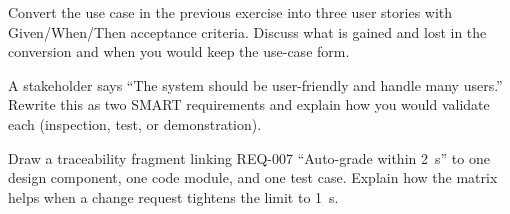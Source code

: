 \begin{exercise}
Convert the use case in the previous exercise into three user stories with Given/When/Then acceptance criteria. Discuss what is gained and lost in the conversion and when you would keep the use-case form.
\end{exercise}

\begin{exercise}
A stakeholder says ``The system should be user-friendly and handle many users.'' Rewrite this as two SMART requirements and explain how you would validate each (inspection, test, or demonstration).
\end{exercise}

\begin{exercise}
Draw a traceability fragment linking REQ-007 ``Auto-grade within 2~s'' to one design component, one code module, and one test case. Explain how the matrix helps when a change request tightens the limit to 1~s.
\end{exercise}
